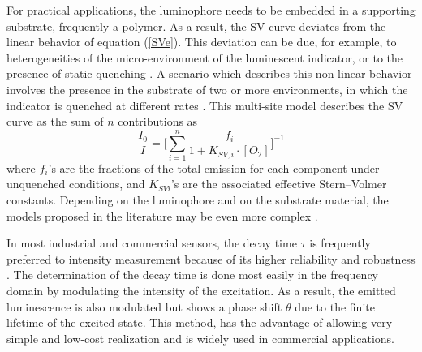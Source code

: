 \documentclass[9pt,twocolumn,twoside,pdftex]{optica}
\begin{document}
For practical applications, the luminophore needs to be embedded in a supporting substrate, frequently a polymer. As a result, the SV curve deviates from the linear behavior of equation (\ref{SVe}). This deviation can be due, for example, to heterogeneities of the micro-environment of the luminescent indicator, or to the presence of static quenching \cite{Wang2014}. A scenario which describes this non-linear behavior involves the presence in the substrate of two or more environments, in which the indicator is quenched at different rates \cite{Carraway1991,Demas1995}. This multi-site model describes the SV curve as the sum of $n$ contributions as
\begin{equation}
\frac{I_0}{I}=\bigg[ \sum_{i=1}^n
\frac{f_i}{1+K_{SV,i} \cdot \left[O_2\right]}
\bigg]^{-1}
\label{SVe2}
\end{equation}
where $f_i$'s are the fractions of the total emission for each component under unquenched conditions, and $K_{SVi}$'s are the associated effective Stern–Volmer constants. Depending on the luminophore and on the substrate material, the models proposed in the literature may be even more complex \cite{Demas1995,Hartmann1995,Mills1999}.

In most industrial and commercial sensors, the decay time $\tau$ is frequently preferred to intensity measurement because of its higher reliability and robustness \cite{Wei2019}. The determination of the decay time is done most easily in the frequency domain by modulating the intensity of the excitation.  As a result, the emitted luminescence is also modulated but shows a phase shift $\theta$ due to the finite lifetime of the excited state. This method, has the advantage of allowing very simple and low-cost realization and is widely used in commercial applications.
\end{document}
